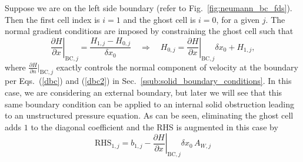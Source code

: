 Suppose we are on the left side boundary (refer to Fig.~\ref{fig:neumann_bc_fds}).  Then the first cell index is $i=1$ and the ghost cell is $i=0$, for a given $j$.  The normal gradient conditions are imposed by constraining the ghost cell such that
\begin{equation}
\left.\frac{\partial H}{\partial x}\right|_{\mathrm{BC},j} = \frac{H_{1,j}-H_{0,j}}{\delta x_0} \quad \Rightarrow \quad H_{0,j} = \left.\frac{\partial H}{\partial x}\right|_{\mathrm{BC},j} \delta x_0 + H_{1,j},
\end{equation}
where $\frac{\partial H}{\partial n}|_{\mathrm{BC},j}$ exactly controls the normal component of velocity at the boundary per Eqs.~(\ref{dbc}) and (\ref{dbc2}) in Sec.~\ref{ssub:solid_boundary_conditions}.  In this case, we are considering an external boundary, but later we will see that this same boundary condition can be applied to an internal solid obstruction leading to an unstructured pressure equation.  As can be seen, eliminating the ghost cell adds $1$ to the diagonal coefficient and the RHS is augmented in this case by
\begin{equation}
\mathrm{RHS}_{1,j} = b_{1,j} - \left.\frac{\partial H}{\partial x}\right|_{\mathrm{BC},j} \delta x_0 \, A_{W,j}
\end{equation}


